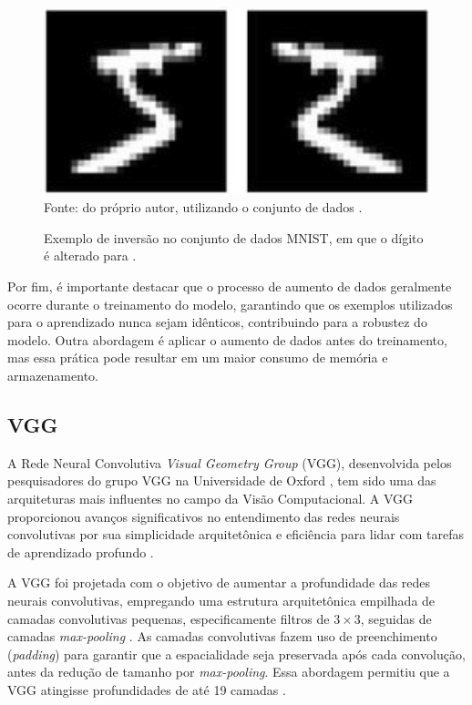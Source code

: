\begin{figure}[H]
    \centering
    \caption{Exemplo de inversão no conjunto de dados MNIST, em que o dígito  é alterado para .}
    \includegraphics[width=1\linewidth]{recursos/imagens/deep/fivetwo.png}
    \label{cnn:fig:augment2}
    Fonte: do próprio autor, utilizando o conjunto de dados \cite{LeCun2010MNISTDatabase}.
\end{figure}

Por fim, é importante destacar que o processo de aumento de dados geralmente ocorre durante o treinamento do modelo, garantindo que os exemplos utilizados para o aprendizado nunca sejam idênticos, contribuindo para a robustez do modelo. Outra abordagem é aplicar o aumento de dados antes do treinamento, mas essa prática pode resultar em um maior consumo de memória e armazenamento.


\subsection{VGG}
\label{cnn:vgg}

A Rede Neural Convolutiva \textit{Visual Geometry Group} (VGG), desenvolvida pelos pesquisadores do grupo VGG na Universidade de Oxford \citep{Simonyan2015}, tem sido uma das arquiteturas mais influentes no campo da Visão Computacional. A VGG proporcionou avanços significativos no entendimento das redes neurais convolutivas por sua simplicidade arquitetônica e eficiência para lidar com tarefas de aprendizado profundo \citep{Simonyan2015}.

A VGG foi projetada com o objetivo de aumentar a profundidade das redes neurais convolutivas, empregando uma estrutura arquitetônica empilhada de camadas convolutivas pequenas, especificamente filtros de $3 \times 3$, seguidas de camadas \textit{max-pooling} \citep{Simonyan2015}. As camadas convolutivas fazem uso de preenchimento (\textit{padding}) para garantir que a espacialidade seja preservada após cada convolução, antes da redução de tamanho por \textit{max-pooling}. Essa abordagem permitiu que a VGG atingisse profundidades de até 19 camadas \citep{Simonyan2015}.

